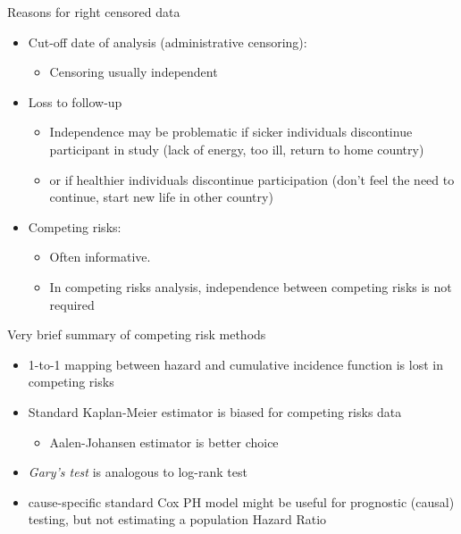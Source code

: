 \documentclass[
  ignorenonframetext,
]{beamer}
\providecommand{\tightlist}{%
  \setlength{\itemsep}{0pt}\setlength{\parskip}{0pt}}
\begin{document}
\begin{frame}{Reasons for right censored data}
\protect\hypertarget{reasons-for-right-censored-data}{}

\begin{itemize}
\tightlist
\item
  Cut-off date of analysis (administrative censoring):

  \begin{itemize}
  \tightlist
  \item
    Censoring usually independent
  \end{itemize}
\item
  Loss to follow-up

  \begin{itemize}
  \tightlist
  \item
    Independence may be problematic if sicker individuals discontinue
    participant in study (lack of energy, too ill, return to home
    country)
  \item
    or if healthier individuals discontinue participation (don't feel
    the need to continue, start new life in other country)
  \end{itemize}
\item
  Competing risks:

  \begin{itemize}
  \tightlist
  \item
    Often informative.
  \item
    In competing risks analysis, independence between competing risks is
    not required
  \end{itemize}
\end{itemize}

\end{frame}

\begin{frame}{Very brief summary of competing risk methods}
\protect\hypertarget{very-brief-summary-of-competing-risk-methods}{}

\begin{itemize}
\tightlist
\item
  1-to-1 mapping between hazard and cumulative incidence function is
  lost in competing risks
\item
  Standard Kaplan-Meier estimator is biased for competing risks data

  \begin{itemize}
  \tightlist
  \item
    Aalen-Johansen estimator is better choice
  \end{itemize}
\item
  \emph{Gary's test} is analogous to log-rank test
\item
  cause-specific standard Cox PH model might be useful for prognostic
  (causal) testing, but not estimating a population Hazard Ratio
\end{itemize}

\end{frame}
\end{document}

